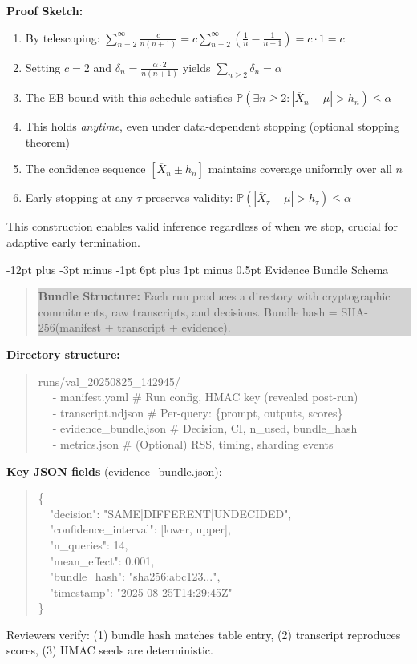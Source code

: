 \documentclass[11pt]{article}
\makeatletter
\renewcommand\subsection{\@startsection{subsection}{2}{\z@}%
  {-12pt plus -3pt minus -1pt}%
  {6pt plus 1pt minus 0.5pt}%
  {\normalfont\large\bfseries}}
\makeatother
\begin{document}
\textbf{Proof Sketch:}
\begin{enumerate}
\item By telescoping: $\sum_{n=2}^{\infty} \frac{c}{n(n+1)} = c \sum_{n=2}^{\infty} \left(\frac{1}{n} - \frac{1}{n+1}\right) = c \cdot 1 = c$
\item Setting $c=2$ and $\delta_n = \frac{\alpha \cdot 2}{n(n+1)}$ yields $\sum_{n \geq 2} \delta_n = \alpha$
\item The EB bound with this schedule satisfies $\mathbb{P}(\exists n \geq 2: |\overline{X}_n - \mu| > h_n) \leq \alpha$
\item This holds \emph{anytime}, even under data-dependent stopping (optional stopping theorem)
\item The confidence sequence $[\overline{X}_n \pm h_n]$ maintains coverage uniformly over all $n$
\item Early stopping at any $\tau$ preserves validity: $\mathbb{P}(|\overline{X}_\tau - \mu| > h_\tau) \leq \alpha$
\end{enumerate}

This construction enables valid inference regardless of when we stop, crucial for adaptive early termination.

\subsection{Evidence Bundle Schema}

\begin{quote}
\colorbox{lightgray}{\parbox{0.95\textwidth}{
\textbf{Bundle Structure:} Each run produces a directory with cryptographic commitments, raw transcripts, and decisions. Bundle hash = SHA-256(manifest + transcript + evidence).
}}
\end{quote}

\noindent\textbf{Directory structure:}
\begin{quote}
\small
runs/val\_20250825\_142945/\\
~~|- manifest.yaml \hfill \# Run config, HMAC key (revealed post-run)\\
~~|- transcript.ndjson \hfill \# Per-query: \{prompt, outputs, scores\}\\
~~|- evidence\_bundle.json \hfill \# Decision, CI, n\_used, bundle\_hash\\
~~|- metrics.json \hfill \# (Optional) RSS, timing, sharding events
\end{quote}

\noindent\textbf{Key JSON fields} (evidence\_bundle.json):
\begin{quote}
\small
\{\\
~~"decision": "SAME|DIFFERENT|UNDECIDED",\\
~~"confidence\_interval": [lower, upper],\\
~~"n\_queries": 14,\\
~~"mean\_effect": 0.001,\\
~~"bundle\_hash": "sha256:abc123...",\\
~~"timestamp": "2025-08-25T14:29:45Z"\\
\}
\end{quote}

Reviewers verify: (1) bundle hash matches table entry, (2) transcript reproduces scores, (3) HMAC seeds are deterministic.
\end{document}
